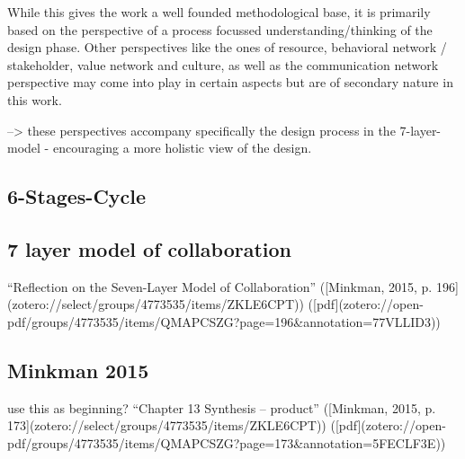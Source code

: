 While this gives the work a well founded methodological base, it is primarily based on the perspective of a process focussed understanding/thinking of the design phase. Other perspectives like the ones of resource, behavioral network / stakeholder, value network and culture, as well as the communication network perspective may come into play in certain aspects but are of secondary nature in this work.

--> these perspectives accompany specifically the design process in the 7-layer-model - encouraging a more holistic view of the design.

\subsection{6-Stages-Cycle}




\subsection{7 layer model of collaboration}

“Reflection on the Seven-Layer Model of Collaboration” ([Minkman, 2015, p. 196](zotero://select/groups/4773535/items/ZKLE6CPT)) ([pdf](zotero://open-pdf/groups/4773535/items/QMAPCSZG?page=196&annotation=77VLLID3))







\subsection{Minkman 2015}
use this as beginning?
“Chapter 13 Synthesis – product” ([Minkman, 2015, p. 173](zotero://select/groups/4773535/items/ZKLE6CPT)) ([pdf](zotero://open-pdf/groups/4773535/items/QMAPCSZG?page=173&annotation=5FECLF3E))

